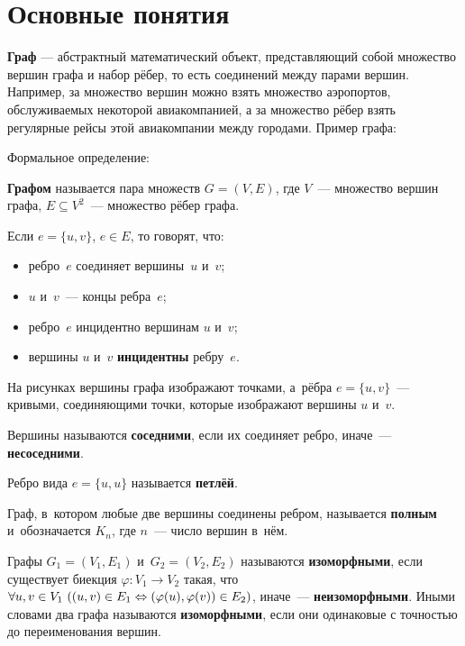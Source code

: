 \section{Основные понятия}
\textbf{Граф} — абстрактный математический объект, представляющий собой множество вершин графа и набор рёбер, то есть соединений между парами вершин. Например, за множество вершин можно взять множество аэропортов, обслуживаемых некоторой авиакомпанией, а за множество рёбер взять регулярные рейсы этой авиакомпании между городами. Пример графа:


Формальное определение:

\textbf{Графом} называется пара множеств $G = (V, E)$, где $V$~--- множество вершин графа, $E \subseteq V^2$~--- множество рёбер графа.

Если $e = \{ u, v \}$, $e \in E$, то говорят, что:
\begin{itemize}
	\item ребро~$e$ соединяет вершины~$u$ и~$v$;
	\item $u$ и~$v$~--- концы ребра~$e$;
	\item ребро~$e$ инцидентно вершинам $u$ и~$v$;
	\item вершины $u$ и~$v$ \textbf{инцидентны} ребру~$e$.
\end{itemize}

На рисунках вершины графа изображают точками, а~рёбра $e = \{ u, v \}$~--- кривыми, соединяющими точки, которые изображают вершины $u$ и~$v$.

Вершины называются \textbf{соседними}, если их соединяет ребро, иначе~--- \textbf{несоседними}.

Ребро вида $e = \{ u, u \}$ называется \textbf{петлёй}.

Граф, в~котором любые две вершины соединены ребром, называется \textbf{полным} и~обозначается $K_n$, где $n$~--- число вершин в~нём.

Графы $G_1 = (V_1, E_1)$ и~$G_2 = (V_2, E_2)$ называются \textbf{изоморфными}, если существует биекция $\varphi \colon V_1 \to V_2$ такая, что
$\forall u, v \in V_1 \ \allowbreak ((u, v) \in E_1 \opbr\Leftrightarrow (\varphi(u), \varphi(v)) \in E_2)$, иначе~--- \textbf{неизоморфными}. Иными словами два графа называются \textbf{изоморфными}, если они одинаковые с точностью до переименования вершин.

